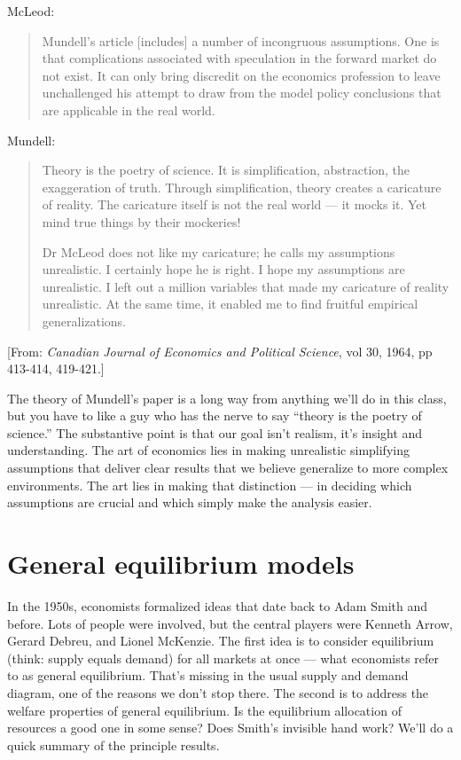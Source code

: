 \documentclass[11pt]{article}
\begin{document}
McLeod:
\begin{quote}
Mundell's article [includes] a number of incongruous assumptions.
One is that complications associated with speculation in the forward market do not exist.
It can only bring discredit on the economics profession to leave unchallenged
his attempt to draw from the model policy conclusions that are applicable in the real world.
\end{quote}
Mundell:
\begin{quote}
Theory is the poetry of science.
It is simplification, abstraction, the exaggeration of truth.
Through simplification, theory creates a caricature of reality.
The caricature itself is not the real world --- it mocks it.
Yet mind true things by their mockeries!

Dr McLeod does not like my caricature; he calls my assumptions unrealistic.
I certainly hope he is right.  I hope my assumptions are unrealistic.
I left out a million variables that made my caricature of reality unrealistic.
At the same time, it enabled me to find fruitful empirical generalizations.
\end{quote}
%
[From:  {\it Canadian Journal of Economics and Political Science\/}, vol 30, 1964, pp 413-414, 419-421.]

The theory of Mundell's paper is a long way from anything
we'll do in this class,
but you have to like a guy who has the nerve to say
``theory is the poetry of science.''
The substantive point is that our goal isn't realism, it's insight and understanding.
The art of economics lies in making unrealistic simplifying assumptions that
deliver clear results that we believe generalize to more complex environments.
The art lies in making that distinction ---
in deciding which assumptions are crucial and
which simply make the analysis easier.


\section{General equilibrium models}

In the 1950s, economists formalized ideas that date back to Adam Smith and before.
Lots of people were involved, but the central players
were Kenneth Arrow, Gerard Debreu, and Lionel McKenzie.
The first idea is to consider equilibrium (think: supply equals demand)
for all markets at once ---
what economists refer to as general equilibrium.
That's missing in the usual supply and demand diagram,
one of the reasons we don't stop there.
The second is to address the welfare properties of general equilibrium.
Is the equilibrium allocation of resources a good one in some sense?
Does Smith's invisible hand work?
We'll do a quick summary of the principle results.
\end{document}
